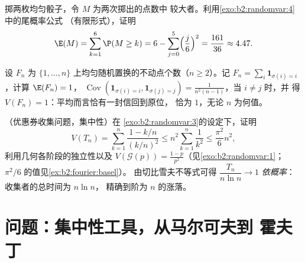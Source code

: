 \begin{exercise}[$\star$]\label{exo:b2:randomvar:10}
掷两枚均匀骰子，令 $M$ 为两次掷出的点数中
较大者。利用\cref{exo:b2:randomvar:4}中的尾概率公式
（有限形式），证明
\[
\E(M) = \sum_{k=1}^{6}\P(M \geq k)
= 6 - \sum_{j=0}^5\Bigl(\frac j6\Bigr)^2 = \frac{161}{36}
\approx 4.47 .
\]
\end{exercise}

\begin{exercise}[$\star\star$]\label{exo:b2:randomvar:11}
设 $F_n$ 为 
$\{1, \dots, n\}$ 上均匀随机置换的不动点个数（$n \geq 2$）。记 $F_n =
\sum_i\mathbf 1_{\sigma(i) = i}$，计算 $\E(F_n) = 1$，
$\operatorname{Cov}(\mathbf 1_{\sigma(i)=i}, \mathbf
1_{\sigma(j)=j}) = \frac1{n^2(n-1)}$，当 $i \neq j$ 时，并
得 $V(F_n) = 1$：平均而言恰有一封信回到原位，
恰为 $1$，无论 $n$ 为何值。
\end{exercise}

\begin{exercise}[$\star\star\star$]\label{exo:b2:randomvar:12}
（优惠券收集问题，集中性）在
\cref{exo:b2:randomvar:3}的设定下，证明
\[
V(T_n) = \sum_{k=1}^n\frac{1 - k/n}{(k/n)^2}
\leq n^2\sum_{k=1}^n\frac{1}{k^2} \leq \frac{\pi^2}{6}n^2,
\]
利用几何各阶段的独立性以及 $V(\mathcal
G(p)) = \frac{1-p}{p^2}$（见\cref{exo:b2:randomvar:1}；
$\pi^2/6$ 的值见\cref{ex:b2:fourier:basel}）。
由切比雪夫不等式可得 $\dfrac{T_n}{n\ln n} \to 1$ \emph{依概率}：
收集者的总时间为 $n\ln n$，
精确到阶为 $n$ 的涨落。
\end{exercise}

\section{问题：集中性工具，从马尔可夫到
霍夫丁}

